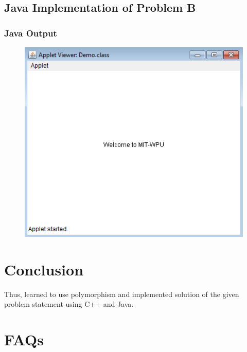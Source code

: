 \documentclass[11pt]{article}
\begin{document}
\subsection{Java Implementation of Problem B}



\subsubsection{Java Output}
\begin{figure}[H]
	\centering
	\includegraphics[scale=0.4]{../Programs/java_implementations/assignment_9/output_assignment_9.png}
\end{figure}


\section{Conclusion}
Thus, learned to use polymorphism and implemented solution of the given problem statement using C++ and Java.
\pagebreak

\section{FAQs}
\end{document}
